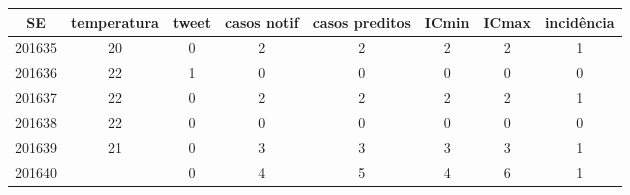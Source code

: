 \begin{tabular}{c|ccccccc}
  \hline
SE & temperatura & tweet & casos notif & casos preditos & ICmin & ICmax & incidência \\ 
  \hline
201635 & 20 & 0 & 2 & 2 & 2 & 2 & 1 \\ 
  201636 & 22 & 1 & 0 & 0 & 0 & 0 & 0 \\ 
  201637 & 22 & 0 & 2 & 2 & 2 & 2 & 1 \\ 
  201638 & 22 & 0 & 0 & 0 & 0 & 0 & 0 \\ 
  201639 & 21 & 0 & 3 & 3 & 3 & 3 & 1 \\ 
  201640 &  & 0 & 4 & 5 & 4 & 6 & 1 \\ 
   \hline
\end{tabular}
